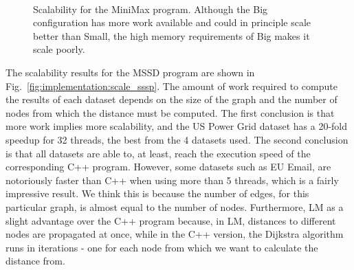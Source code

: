 \begin{figure}[]
\begin{subfigure}[b]{\plotsize\textwidth}
                \label{fig:implementation:scale_minmax_big}
        \end{subfigure}\\

        \caption{Scalability for the MiniMax program. Although the Big
           configuration has more work available and could in principle scale
           better than Small, the high memory requirements of Big makes it scale
           poorly.}

        \label{fig:implementation:scale_minmax}
\end{figure}

The scalability results for the MSSD program are shown in
Fig.~\ref{fig:implementation:scale_sssp}. The amount of work required to compute
the results of each dataset depends on the size of the graph and the number of
nodes from which the distance must be computed. The first conclusion is that
more work implies more scalability, and the US Power Grid dataset has a 20-fold
speedup for 32 threads, the best from the 4 datasets used. The second conclusion is that
all datasets are able to, at least, reach the execution speed of the corresponding
C++ program. However, some datasets such as EU Email, are notoriously faster
than C++ when using more than 5 threads, which is a fairly impressive result. We
think this is because the number of edges, for this particular graph, is almost
equal to the number of nodes. Furthermore, LM as a slight advantage over the C++
program because, in LM, distances to different nodes are propagated at once,
while in the C++ version, the Dijkstra algorithm runs in iterations - one for
each node from which we want to calculate the distance from.

